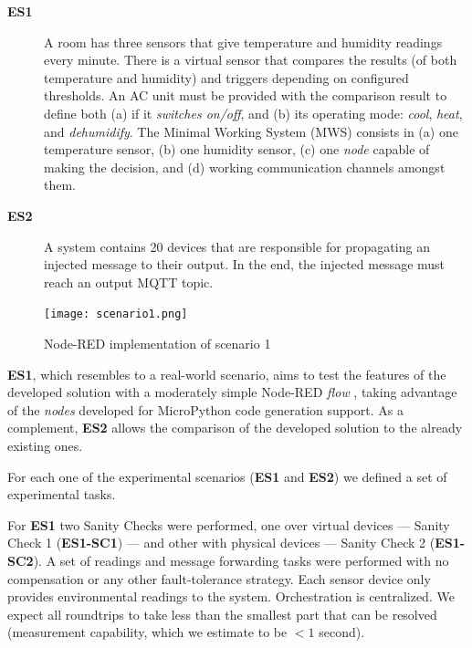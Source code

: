 \begin{description}
    \item[\textbf{ES1}] A room has three sensors that give temperature and humidity readings every minute. There is a virtual sensor that compares the results (of both temperature and humidity) and triggers depending on configured thresholds. An AC unit must be provided with the comparison result to define both (a) if it \textit{switches on/off}, and (b) its operating mode: \textit{cool}, \textit{heat}, and \textit{dehumidify}. The Minimal Working System (MWS) consists in (a) one temperature sensor, (b) one humidity sensor, (c) one \textit{node} capable of making the decision, and (d) working communication channels amongst them.
    \item[\textbf{ES2}] A system contains 20 devices that are responsible for propagating an injected message to their output. In the end, the injected message must reach an output MQTT topic.
\end{description}

\begin{figure}[h]
\centering
\texttt{[image: scenario1.png]}
\caption[Node-RED implementation of scenario 1]{Node-RED implementation of scenario 1}\label{fig:scenario1_node_red}
\end{figure}

\textbf{ES1}, which resembles to a real-world scenario, aims to test the features of the developed solution with a moderately simple Node-RED \textit{flow} , taking advantage of the \textit{nodes} developed for MicroPython code generation support. As a complement, \textbf{ES2} allows the comparison of the developed solution to the already existing ones.

For each one of the experimental scenarios (\ie \textbf{ES1} and \textbf{ES2}) we defined a set of experimental tasks. 

For \textbf{ES1} two Sanity Checks were performed, one over virtual devices --- Sanity Check 1 (\textbf{ES1-SC1}) --- and other with physical devices --- Sanity Check 2 (\textbf{ES1-SC2}). A set of readings and message forwarding tasks were performed with no compensation or any other fault-tolerance strategy. Each sensor device only provides environmental readings to the system. Orchestration is centralized. We expect all roundtrips to take less than the smallest part that can be resolved (measurement capability, which we estimate to be $<1$ second).

